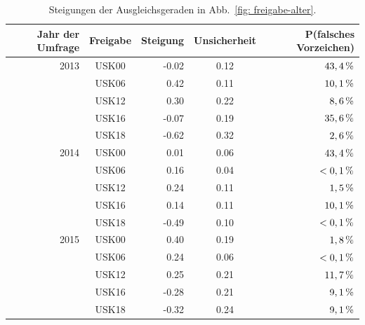 \documentclass[11pt]{scrartcl}
\begin{document}
\begin{table}[ht]
\caption{Steigungen der Ausgleichsgeraden in Abb.~\ref{fig: freigabe-alter}.}
\label{tab: freigabe-alter}
\vspace{1em}
\centering
\begin{tabular}{r|c|r|c|r}
Jahr der Umfrage & Freigabe	&	Steigung	& Unsicherheit & P(falsches Vorzeichen)\\
\hline
2013 & USK00 & -0.02 & 0.12 & \(\unit[ 43,4]{\%}\)\\
	 & USK06 &  0.42 & 0.11 & \(\unit[ 10,1]{\%}\)\\
	 & USK12 &  0.30 & 0.22 & \(\unit[  8,6]{\%}\)\\
	 & USK16 & -0.07 & 0.19 & \(\unit[ 35,6]{\%}\)\\
	 & USK18 & -0.62 & 0.32 & \(\unit[  2,6]{\%}\)\\
\hline
2014 & USK00 &  0.01 & 0.06 & \(\unit[43,4]{\%}\)\\
	 & USK06 &  0.16 & 0.04 & \(\unit[<0,1]{\%}\)\\
	 & USK12 &  0.24 & 0.11 & \(\unit[ 1,5]{\%}\)\\
	 & USK16 &  0.14 & 0.11 & \(\unit[10,1]{\%}\)\\
	 & USK18 & -0.49 & 0.10 & \(\unit[<0,1]{\%}\)\\
\hline
2015 & USK00 &  0.40 & 0.19 & \(\unit[ 1,8]{\%}\)\\
	 & USK06 &  0.24 & 0.06 & \(\unit[<0,1]{\%}\)\\
	 & USK12 &  0.25 & 0.21 & \(\unit[11,7]{\%}\)\\
	 & USK16 & -0.28 & 0.21 & \(\unit[ 9,1]{\%}\)\\
	 & USK18 & -0.32 & 0.24 & \(\unit[ 9,1]{\%}\)\\
\end{tabular}
\end{table}


\clearpage
{}

\end{document}
